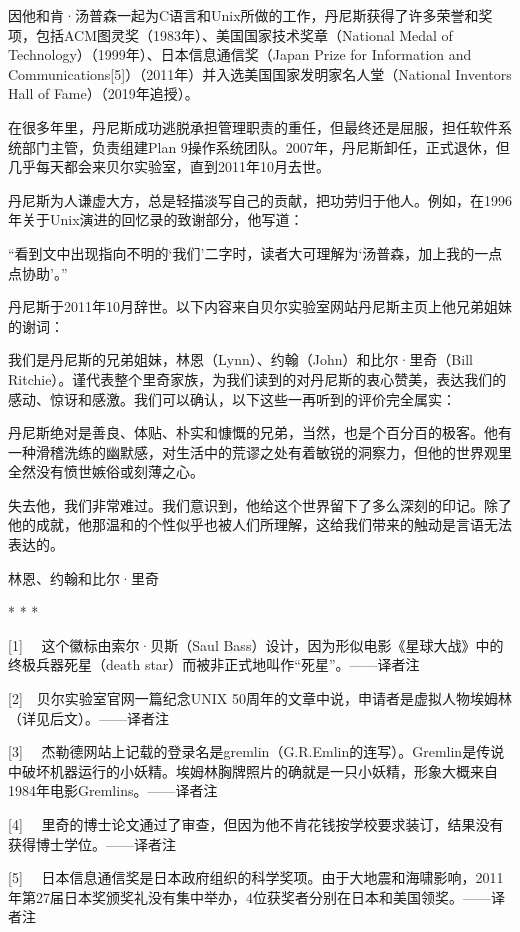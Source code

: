 \documentclass[a4paper,12pt,UTF8,twoside]{ctexbook}
\begin{document}
{因他和肯·汤普森一起为C语言和Unix所做的工作，丹尼斯获得了许多荣誉和奖项，包括ACM图灵奖（1983年）、美国国家技术奖章（National Medal of Technology）（1999年）、日本信息通信奖（Japan Prize for Information and Communications[5]）（2011年）并入选美国国家发明家名人堂（National Inventors Hall of Fame）（2019年追授）。

在很多年里，丹尼斯成功逃脱承担管理职责的重任，但最终还是屈服，担任软件系统部门主管，负责组建Plan 9操作系统团队。2007年，丹尼斯卸任，正式退休，但几乎每天都会来贝尔实验室，直到2011年10月去世。

丹尼斯为人谦虚大方，总是轻描淡写自己的贡献，把功劳归于他人。例如，在1996年关于Unix演进的回忆录的致谢部分，他写道：

“看到文中出现指向不明的‘我们’二字时，读者大可理解为‘汤普森，加上我的一点点协助’。”



丹尼斯于2011年10月辞世。以下内容来自贝尔实验室网站丹尼斯主页上他兄弟姐妹的谢词：

我们是丹尼斯的兄弟姐妹，林恩（Lynn）、约翰（John）和比尔·里奇（Bill Ritchie）。谨代表整个里奇家族，为我们读到的对丹尼斯的衷心赞美，表达我们的感动、惊讶和感激。我们可以确认，以下这些一再听到的评价完全属实：

丹尼斯绝对是善良、体贴、朴实和慷慨的兄弟，当然，也是个百分百的极客。他有一种滑稽洗练的幽默感，对生活中的荒谬之处有着敏锐的洞察力，但他的世界观里全然没有愤世嫉俗或刻薄之心。

失去他，我们非常难过。我们意识到，他给这个世界留下了多么深刻的印记。除了他的成就，他那温和的个性似乎也被人们所理解，这给我们带来的触动是言语无法表达的。

林恩、约翰和比尔·里奇





* * *



[1]　 这个徽标由索尔·贝斯（Saul Bass）设计，因为形似电影《星球大战》中的终极兵器死星（death star）而被非正式地叫作“死星”。——译者注

[2]　贝尔实验室官网一篇纪念UNIX 50周年的文章中说，申请者是虚拟人物埃姆林（详见后文）。——译者注

[3] 　杰勒德网站上记载的登录名是gremlin（G.R.Emlin的连写）。Gremlin是传说中破坏机器运行的小妖精。埃姆林胸牌照片的确就是一只小妖精，形象大概来自1984年电影Gremlins。——译者注

[4] 　里奇的博士论文通过了审查，但因为他不肯花钱按学校要求装订，结果没有获得博士学位。——译者注

[5] 　日本信息通信奖是日本政府组织的科学奖项。由于大地震和海啸影响，2011年第27届日本奖颁奖礼没有集中举办，4位获奖者分别在日本和美国领奖。——译者注





}
\end{document}
